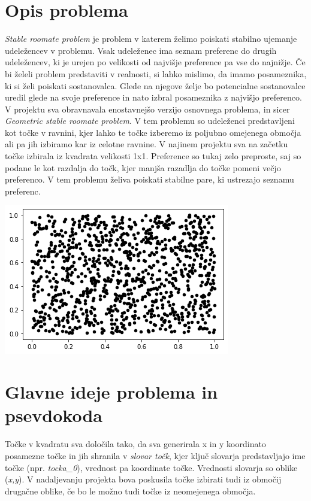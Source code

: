 \documentclass[12pt, a4paper]{article}
\begin{document}
\newpage

\section{Opis problema}
\textit{Stable roomate problem} je problem v katerem želimo poiskati stabilno ujemanje udeležencev v problemu. Vsak udeleženec ima seznam preferenc do drugih udeležencev, ki je urejen po velikosti od najvišje preference pa vse do najnižje. Če bi želeli problem predstaviti v realnosti, si lahko mislimo, da imamo posameznika, ki si želi poiskati sostanovalca. Glede na njegove želje bo potencialne sostanovalce uredil glede na svoje preference in nato izbral posameznika z najvišjo preferenco.\\

V projektu  sva obravnavala enostavnejšo verzijo osnovnega problema, in sicer \textit{Geometric stable roomate problem}. V tem problemu so udeleženci predstavljeni kot točke v ravnini, kjer lahko te točke izberemo iz poljubno omejenega območja ali pa jih izbiramo kar iz celotne ravnine. V najinem projektu sva na začetku točke izbirala iz kvadrata velikosti 1x1. Preference so tukaj zelo preproste, saj so podane le kot razdalja do točk, kjer manjša razadlja do točke pomeni večjo preferenco. V tem problemu želiva poiskati stabilne pare, ki ustrezajo seznamu preferenc. \\

\begin{center}
\includegraphics{rdece_tocke.png}
\end{center}


\pagebreak
\section{Glavne ideje problema in psevdokoda}
Točke v kvadratu sva določila tako, da sva generirala x in y koordinato posamezne točke in jih shranila v \textit{slovar točk}, kjer ključ slovarja predstavljajo ime točke (npr. \textit{tocka_0}), vrednost pa koordinate točke. Vrednosti slovarja so oblike (\textit{x,y}). V nadaljevanju projekta bova poskusila točke izbirati tudi iz območij drugačne oblike, če bo le možno tudi točke iz neomejenega območja.\\
\end{document}

